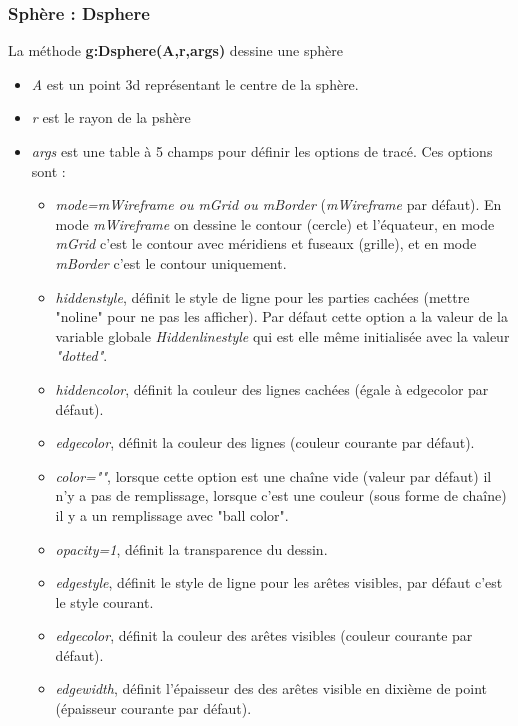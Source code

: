 \subsubsection{ Sphère : Dsphere}

La méthode \textbf{g:Dsphere(A,r,args)} dessine une sphère

\begin{itemize}
    \item \emph{A} est un point 3d représentant le centre de la sphère.
    \item \emph{r} est le rayon de la pshère
    \item \emph{args} est une table à 5 champs pour définir les options de tracé. Ces options sont :
        \begin{itemize}
            \item \emph{mode=mWireframe ou mGrid ou mBorder} (\emph{mWireframe} par défaut). En mode \emph{mWireframe} on dessine le contour (cercle) et l'équateur, en mode \emph{mGrid} c'est le contour avec méridiens et fuseaux (grille), et en mode \emph{mBorder} c'est le contour uniquement.
            \item \emph{hiddenstyle}, définit le style de ligne pour les parties cachées (mettre "noline" pour ne pas les afficher). Par défaut cette option a la valeur de la variable globale \emph{Hiddenlinestyle} qui est elle même initialisée avec la valeur \emph{"dotted"}.
            \item \emph{hiddencolor}, définit la couleur des lignes cachées (égale à edgecolor par défaut).
            \item \emph{edgecolor}, définit la couleur des lignes (couleur courante par défaut).
            \item \emph{color=""}, lorsque cette option est une chaîne vide (valeur par défaut) il n'y a pas de remplissage,  lorsque c'est une couleur (sous forme de chaîne) il y a un remplissage avec "ball color".
            \item \emph{opacity=1}, définit la transparence du dessin.
            \item \emph{edgestyle}, définit le style de ligne pour les arêtes visibles, par défaut c'est le style courant.
            \item \emph{edgecolor}, définit la couleur des arêtes visibles (couleur courante par défaut).
            \item \emph{edgewidth}, définit l'épaisseur des des arêtes visible en dixième de point (épaisseur courante par défaut).
        \end{itemize}
\end{itemize}

